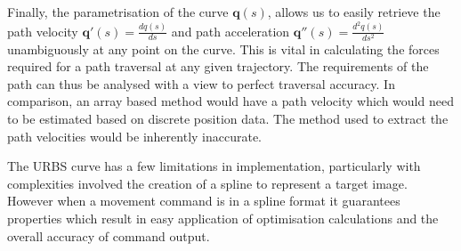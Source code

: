 Finally, the parametrisation of the curve $\textbf{q}(s)$, allows us to easily retrieve the path velocity $\textbf{q}'(s) = \frac{dq(s)}{ds}$ and path acceleration $\textbf{q}''(s) =  \frac{d^2q(s)}{ds^2}$ unambiguously at any point on the curve. This is vital in calculating the forces required for a path traversal at any given trajectory. The requirements of the path can thus be analysed with a view to perfect traversal accuracy. In comparison, an array based method would have a path velocity which would need to be estimated based on discrete position data. The method used to extract the path velocities would be inherently inaccurate.

The URBS curve has a few limitations in implementation, particularly with complexities involved the creation of a spline to represent a target image. However when a movement command is in a spline format it guarantees properties which result in easy application of optimisation calculations and the overall accuracy of command output.